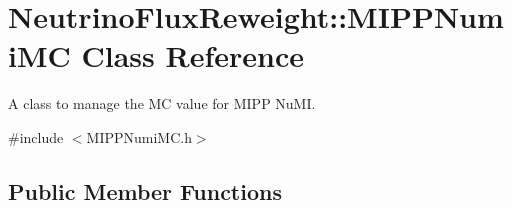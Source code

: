 \hypertarget{class_neutrino_flux_reweight_1_1_m_i_p_p_numi_m_c}{\section{Neutrino\-Flux\-Reweight\-:\-:M\-I\-P\-P\-Numi\-M\-C Class Reference}
\label{class_neutrino_flux_reweight_1_1_m_i_p_p_numi_m_c}
}


A class to manage the M\-C value for M\-I\-P\-P Nu\-M\-I.  




{\ttfamily \#include $<$M\-I\-P\-P\-Numi\-M\-C.\-h$>$}

\subsection*{Public Member Functions}
